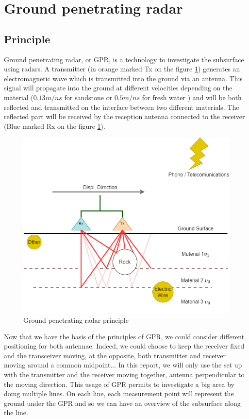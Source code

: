 \newpage
\section{Ground penetrating radar}

\subsection{Principle}

Ground penetrating radar, or GPR, is a technology to investigate the subsurface using radars. A transmitter (in orange marked Tx on the figure \ref{fig:GPR}) generates an electromagnetic wave which is transmitted into the ground via an antenna. This signal will propagate into the ground at different velocities depending on the material ($0.13 m/ns$ for sandstone or $0.5 m/ns$ for fresh water \cite{GPRAnalysis}) and will be both reflected and transmitted on the interface between two different materials. The reflected part will be received by the reception antenna connected to the receiver (Blue marked Rx on the figure \ref{fig:GPR}).

\begin{figure}[h]
    \centering
    \includegraphics[width=0.8\linewidth]{Images/00_Theory/GPR Diagramm.drawio.png}
    \caption{Ground penetrating radar principle}
    \label{fig:GPR}
\end{figure}

Now that we have the basis of the principles of GPR, we could consider different positioning for both antennae. Indeed, we could choose to keep the receiver fixed and the transceiver moving, at the opposite, both transmitter and receiver moving around a common midpoint... In this report, we will only use the set up with the transmitter and the receiver moving together, antenna perpendicular to the moving direction.
This usage of GPR permits to investigate a big area by doing multiple lines. On each line, each measurement point will represent the ground under the GPR and so we can have an overview of the subsurface along the line. \cite{Rnning2023GroundPerformance}

